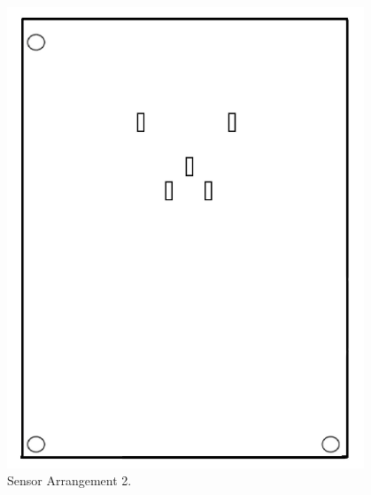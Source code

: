 \begin{figure}[H]
\centering
\includegraphics[width=0.95\textwidth]{figures/sarray2.jpg}
\caption{Sensor Arrangement 2.}
\end{figure}

